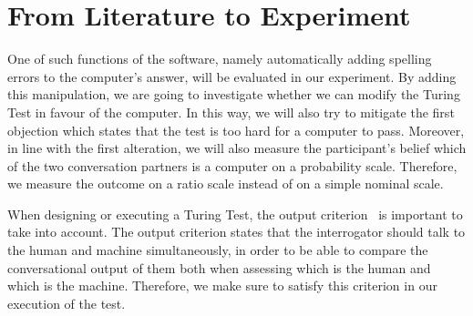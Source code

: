 \section{From Literature to Experiment}

One of such functions of the software, namely automatically adding spelling errors to the computer’s answer, will be evaluated in our experiment. By adding this manipulation, we are going to investigate whether we can modify the Turing Test in favour of the computer. In this way, we will also try to mitigate the first objection which states that the test is too hard for a computer to pass. Moreover, in line with the first alteration, we will also measure the participant’s belief which of the two conversation partners is a computer on a probability scale. Therefore, we measure the outcome on a ratio scale instead of on a simple nominal scale.

When designing or executing a Turing Test, the output criterion~\cite{copeland2015artificial} is important to take into account. The output criterion states that the interrogator should talk to the human and machine simultaneously, in order to be able to compare the conversational output of them both when assessing which is the human and which is the machine. Therefore, we make sure to satisfy this criterion in our execution of the test.
